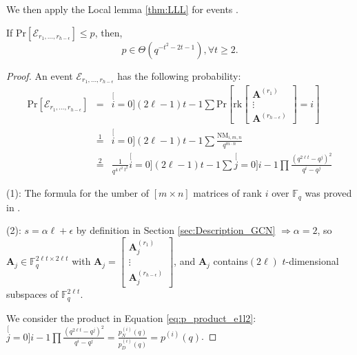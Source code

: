 We then apply the Local lemma \ref{thm:LLL} for events .
\begin{lem}
\label{lem:p_e1l2} If $\mathrm{Pr}\left[\mathcal{E}_{r_{1},\ldots,r_{h-\epsilon}}\right]\leq p$,
then,
\[
p\in\Theta\left(q^{-t^{2}-2t-1}\right),\forall t\geq2.
\]
\end{lem}
\begin{proof}
An event $\mathcal{E}_{r_{1},\ldots,r_{h-\epsilon}}$ has the following
probability:
\begin{eqnarray}
\mathrm{Pr}\left[\mathcal{E}_{r_{1},\ldots,r_{h-\epsilon}}\right] & = & \stackrel[i=0]{\left(2\ell-1\right)t-1}{\mathop{\sum}}\mathrm{Pr}\left[\mathrm{rk}\left[\begin{array}{c}
\boldsymbol{A}^{\left(r_{1}\right)}\\
\vdots\\
\boldsymbol{A}^{\left(r_{h-\epsilon}\right)}
\end{array}\right]=i\right]\nonumber \\
 & \overset{1}{=} & \stackrel[i=0]{\left(2\ell-1\right)t-1}{\mathop{\sum}}\frac{\mathrm{NM}_{i,m,n}}{q^{m\cdot n}}\nonumber \\
 & \overset{2}{=} & \frac{1}{q^{4\ell^{2}t^{2}}}\stackrel[i=0]{\left(2\ell-1\right)t-1}{\mathop{\sum}}\stackrel[j=0]{i-1}{\mathop{\prod}}\frac{\left(q^{2\ell t}-q^{j}\right)^{2}}{q^{i}-q^{j}}\label{eq:p_product_e1l2}
\end{eqnarray}

(1): The formula for the umber of $\left[m\times n\right]$ matrices
of rank $i$ over $\ensuremath{\mathbb{F}}_{q}$ was proved in \cite{Overbeck:2007}.

(2): $s=\alpha\ell+\epsilon$ by definition in Section \ref{sec:Description_GCN}
$\Rightarrow\alpha=2$, so $\boldsymbol{A}_{j}\in\ensuremath{\mathbb{F}}_{q}^{2\ell t\times2\ell t}$
with $\boldsymbol{A}_{j}=\left[\begin{array}{c}
\boldsymbol{A}_{j}^{\left(r_{1}\right)}\\
\vdots\\
\boldsymbol{A}_{j}^{\left(r_{h-\epsilon}\right)}
\end{array}\right]$, and $\boldsymbol{A}_{j}$ contains$\left(2\ell\right)$ $t$-dimensional
subspaces of $\ensuremath{\mathbb{F}}_{q}^{2\ell t}$.

We consider the product in Equation \ref{eq:p_product_e1l2}: $\stackrel[j=0]{i-1}{\mathop{\prod}}\frac{\left(q^{2\ell t}-q^{j}\right)^{2}}{q^{i}-q^{j}}=\frac{p_{N}^{(i)}(q)}{p_{D}^{(i)}(q)}=p^{(i)}(q)$.


\end{proof}
